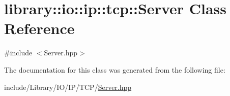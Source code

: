 \hypertarget{classlibrary_1_1io_1_1ip_1_1tcp_1_1_server}{}\section{library\+:\+:io\+:\+:ip\+:\+:tcp\+:\+:Server Class Reference}
\label{classlibrary_1_1io_1_1ip_1_1tcp_1_1_server}


{\ttfamily \#include $<$Server.\+hpp$>$}



The documentation for this class was generated from the following file\+:\begin{DoxyCompactItemize}
\item 
include/\+Library/\+I\+O/\+I\+P/\+T\+C\+P/\hyperlink{_server_8hpp}{Server.\+hpp}\end{DoxyCompactItemize}
